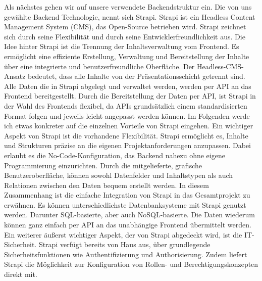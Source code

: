 Als nächstes gehen wir auf unsere verwendete Backendstruktur ein. Die von uns gewählte Backend Technologie, nennt sich Strapi.
Strapi ist ein Headless Content Management System (CMS), das Open-Source betrieben wird. Strapi zeichnet sich durch seine Flexibilität und durch seine Entwicklerfreundlichkeit aus. Die Idee hinter Strapi ist die Trennung der Inhaltsverwaltung vom Frontend.
Es ermöglicht eine effiziente Erstellung, Verwaltung und Bereitstellung der Inhalte über eine integrierte und benutzerfreundliche Oberfläche. Der Headless-CMS-Ansatz bedeutet, dass alle Inhalte von der Präsentationsschicht getrennt sind. Alle Daten die in Strapi abgelegt und verwaltet werden, werden per API an das Frontend bereitgestellt.
Durch die Bereitstellung der Daten per API, ist Strapi in der Wahl des Frontends flexibel, da APIs grundsätzlich einem standardisierten Format folgen und jeweils leicht angepasst werden können. 
Im Folgenden werde ich etwas konkreter auf die einzelnen Vorteile von Strapi eingehen.
Ein wichtiger Aspekt von Strapi ist die vorhandene Flexibilität. Strapi ermöglicht es, Inhalte und Strukturen präzise an die eigenen Projektanforderungen anzupassen. Dabei erlaubt es die No-Code-Konfiguration, das Backend nahezu ohne eigene Programmierung einzurichten. Durch die mitgelieferte, grafische Benutzeroberfläche, können sowohl Datenfelder und Inhaltstypen als auch Relationen zwischen den Daten bequem erstellt werden.
In diesem Zusammenhang ist die einfache Integration von Strapi in das Gesamtprojekt zu erwähnen. Es können unterschiedlichste Datenbanksysteme mit Strapi genutzt werden. Darunter SQL-basierte, aber auch NoSQL-basierte. Die Daten wiederum können ganz einfach per API an das unabhängige Frontend übermittelt werden.
Ein weiterer äußerst wichtiger Aspekt, der von Strapi abgedeckt wird, ist die IT-Sicherheit. Strapi verfügt bereits von Haus aus, über grundlegende Sicherheitsfunktionen wie Authentifizierung und Authorisierung. Zudem liefert Strapi die Möglichkeit zur Konfiguration von Rollen- und Berechtigungskonzepten direkt mit.